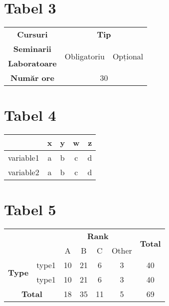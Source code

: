 \documentclass[9pt,a4paper]{article}
\begin{document}
\section*{Tabel 3}

\begin{tabular}{|c|c|c|}
    \hline
    \bf Cursuri     & \multicolumn{2}{c|}{\bf Tip}                             \\
    \cline{2-3}
    \bf Seminarii   & \multirow{2}{*}{Obligatoriu} & \multirow{2}{*}{Opțional} \\
    \bf Laboratoare &                              &                           \\
    \hline \hline
    \bf Număr ore   & \multicolumn{2}{c|}{30}                                  \\ \hline
\end{tabular}

\section*{Tabel 4}

\begin{tabular}{rcccr}
    \hline
    \rowcolor{yellow} & x        & y        & w        & z \\
    \hline
    variable1 \vline  & a \vline & b \vline & c \vline & d \\
    variable2 \vline  & a \vline & b \vline & c \vline & d \\
    \hline
\end{tabular}

\section*{Tabel 5}

\begin{tabular}{|c|c|c|c|c|c|c|}
    \hline
    \multicolumn{2}{|c|}{\cellcolor{yellow}} & \multicolumn{4}{c|}{\bf Rank} & \multirow{2}{*}{\bf Total}                        \\
    \cline{3-6}
    \multicolumn{2}{|c|}{\cellcolor{yellow}} & A                             & B                          & C  & Other &         \\
    \hline
    \multirow{2}{*}{\bf Type}                & type1                         & 10                         & 21 & 6     & 3  & 40 \\
    \cline{2-7}
                                             & type1                         & 10                         & 21 & 6     & 3  & 40 \\
    \hline
    \multicolumn{2}{|c|}{\bf Total}          & 18                            & 35                         & 11 & 5     & 69      \\

    \hline
\end{tabular}
\end{document}
